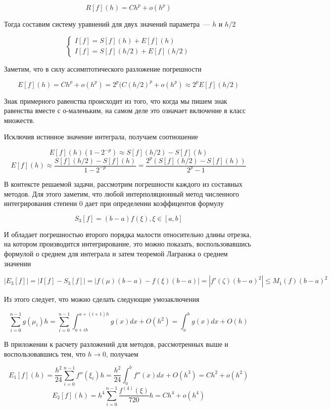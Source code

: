 \documentclass[11pt,a4paper,oneside]{article}
\begin{document}
$$ R[f](h) = C h^p + o(h^p) $$

Тогда составим систему уравнений для двух значений параметра~--- $h$ и $h / 2$

$$ \left\{ \begin{array}{l}
	I[f] = S[f](h) + E[f](h) \\
	I[f] = S[f](h / 2) + E[f](h / 2)
\end{array} \right. $$

Заметим, что в силу ассимптотического разложение погрешности

$$ E[f](h) = C h^p + o(h^p) = 2^{p} (C (h / 2)^p + o(h^p) \approx 2^{p} E[f](h / 2) $$

Знак примерного равенства происходит из того, что когда мы пишем знак равенства вместе с о-маленьким, на самом деле это означает включение в класс множеств.

Исключив истинное значение интеграла, получаем соотношение

$$ E[f](h) (1 - 2^{-p}) \approx S[f](h / 2) - S[f](h) $$
$$ E[f](h) \approx \frac{S[f](h / 2) - S[f](h)}{1 - 2^{-p}}
	= \frac{2^p \left( S[f](h / 2) - S[f](h) \right)}{2^p - 1} $$

В контексте решаемой задачи, рассмотрим погрешности каждого из составных методов. Для этого заметим, что любой интерполяционный метод численного интегрирования степени 0 дает при определении коэффицентов формулу

$$ S_3[f] = (b - a) f(\xi), \xi \in [a, b] $$

И обладает погрешностью второго порядка малости относительно длины отрезка, на котором производится интегрирование, это можно показать, воспользовавшись формулой о среднем для интеграла и затем теоремой Лагранжа о среднем значении

$$ \left| E_3[f] \right| = \left| I[f] - S_3[f] \right|
	= \left| f(\mu) (b - a) - f(\xi) (b - a) \right|
	= \left| f'(\zeta) (b - a)^2 \right| \le M_1(f) (b - a)^2 $$

Из этого следует, что можно сделать следующие умозаключения

$$ \sum_{i = 0}^{n - 1} g(\mu_i) h = \sum_{i = 0}^{n - 1} \int_{a + ih}^{a + (i + 1)h} g(x) dx + O(h^2)
	= \int_{a}^{b} g(x) dx + O(h) $$
	
В приложении к расчету разложений для методов, рассмотренных выше и воспользовавшись тем, что $h \to 0$, получаем

$$ E_1[f](h) = \frac{h^2}{24} \sum_{i = 0}^{n - 1} f''(\xi_i) h
	= \frac{h^2}{24} \int_{a}^{b} f''(x) dx + O(h^3) = C h^2 + o(h^2) $$
$$ E_2[f](h) = h^4 \sum_{i = 0}^{n - 1} \frac{f^{(4)}(\xi)}{720} h = C h^4 + o(h^4) $$
\end{document}
